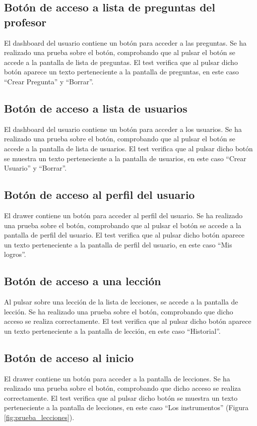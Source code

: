 \subsection{Botón de acceso a lista de preguntas del profesor}
\label{subsec:pruebas-controlador-boton-preguntas}
El dashboard del usuario contiene un botón para acceder a las preguntas. Se ha realizado una prueba sobre el botón, comprobando que al pulsar el botón se accede a la pantalla de lista de preguntas. 
El test verifica que al pulsar dicho botón aparece un texto perteneciente a la pantalla de preguntas, en este caso ``Crear Pregunta'' y ``Borrar''.

\subsection{Botón de acceso a lista de usuarios }
\label{subsec:pruebas-controlador-boton-usuarios}
El dashboard del usuario contiene un botón para acceder a los usuarios. Se ha realizado una prueba sobre el botón, comprobando que al pulsar el botón se accede a la pantalla de lista de usuarios. 
El test verifica que al pulsar dicho botón se muestra un texto perteneciente a la pantalla de usuarios, en este caso ``Crear Usuario'' y ``Borrar''.

\subsection{Botón de acceso al perfil del usuario}
\label{subsec:pruebas-controlador-boton-perfil-usuario}
El drawer contiene un botón para acceder al perfil del usuario. Se ha realizado una prueba sobre el botón, comprobando que al pulsar el botón se accede a la pantalla de perfil del usuario.
El test verifica que al pulsar dicho botón aparece un texto perteneciente a la pantalla de perfil del usuario, en este caso ``Mis logros''.

\subsection{Botón de acceso a una lección}
\label{subsec:pruebas-controlador-boton-leccion}
Al pulsar sobre una lección de la lista de lecciones, se accede a la pantalla de lección. Se ha realizado una prueba sobre el botón, comprobando que dicho acceso se realiza correctamente.
El test verifica que al pulsar dicho botón aparece un texto perteneciente a la pantalla de lección, en este caso ``Historial''.

\subsection{Botón de acceso al inicio}
\label{subsec:pruebas-controlador-boton-leccion}
El drawer contiene un botón para acceder a la pantalla de lecciones. Se ha realizado una prueba sobre el botón, comprobando que dicho acceso se realiza correctamente.
El test verifica que al pulsar dicho botón se muestra un texto perteneciente a la pantalla de lecciones, en este caso ``Los instrumentos'' (Figura \ref{fig:prueba_lecciones}).

